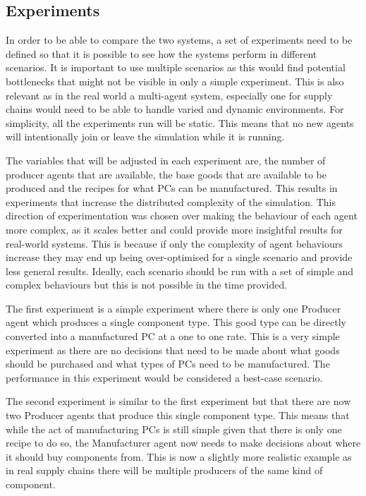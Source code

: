 \subsection{Experiments}

In order to be able to compare the two systems, a set of experiments need to be defined so that it is possible to see how the systems perform in different scenarios.
It is important to use multiple scenarios as this would find potential bottlenecks that might not be visible in only a simple experiment.
This is also relevant as in the real world a multi-agent system, especially one for supply chains would need to be able to handle varied and dynamic environments.
For simplicity, all the experiments run will be static.
This means that no new agents will intentionally join or leave the simulation while it is running.

The variables that will be adjusted in each experiment are, the number of producer agents that are available, the base goods that are available to be produced and the recipes for what PCs can be manufactured.
This results in experiments that increase the distributed complexity of the simulation.
This direction of experimentation was chosen over making the behaviour of each agent more complex, as it scales better and could provide more insightful results for real-world systems.
This is because if only the complexity of agent behaviours increase they may end up being over-optimised for a single scenario and provide less general results.
Ideally, each scenario should be run with a set of simple and complex behaviours but this is not possible in the time provided.

The first experiment is a simple experiment where there is only one Producer agent which produces a single component type.
This good type can be directly converted into a manufactured PC at a one to one rate.
This is a very simple experiment as there are no decisions that need to be made about what goods should be purchased and what types of PCs need to be manufactured.
The performance in this experiment would be considered a best-case scenario.

The second experiment is similar to the first experiment but that there are now two Producer agents that produce this single component type.
This means that while the act of manufacturing PCs is still simple given that there is only one recipe to do so, the Manufacturer agent now needs to make decisions about where it should buy components from.
This is now a slightly more realistic example as in real supply chains there will be multiple producers of the same kind of component.

